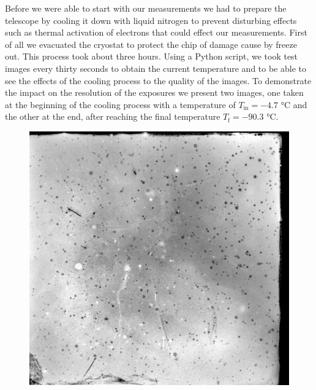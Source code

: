 Before we were able to start with our measurements we had to prepare the telescope by cooling it down with liquid nitrogen to prevent disturbing effects such as thermal activation of electrons that could effect our measurements. First of all we evacuated the cryostat to protect the chip of damage cause by freeze out. This process took about three hours. Using a Python script, we took test images every thirty seconds to obtain the current temperature and to be able to see the effects of the cooling process to the quality of the images. To demonstrate the impact on the resolution of the exposures we present two images, one taken at the beginning of the cooling process with a temperature of $T_{\text{in}} = -4.7$ °C  and the other at the end, after reaching the final temperature $T_{\text{f}} = -90.3$ °C.
\begin{figure}[H]
	\begin{minipage}{0.35\textwidth}
	\hspace{0.15\textwidth}
		\includegraphics[scale = 0.17]{figures/Exposures/cooling_start}
	\end{minipage}
	\hfill
	\begin{minipage}{0.35\textwidth}
		\hspace{-0.4\textwidth}

\end{minipage}
\end{figure}
